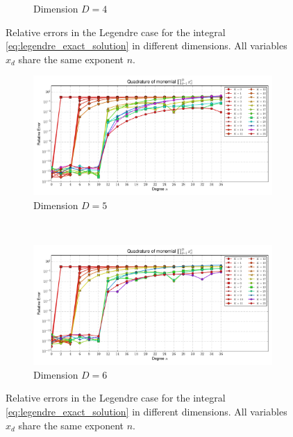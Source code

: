 \documentclass[a4paper,10pt]{article}
\begin{document}
\begin{figure}
\begin{subfigure}[b]{\linewidth}
    \caption{Dimension $D=4$}
    \label{fig:monomial_errors_legendre_multivariate_dimension_4}
  \end{subfigure}
  \caption{Relative errors in the Legendre case for the integral \eqref{eq:legendre_exact_solution}
    in different dimensions. All variables $x_d$ share the same exponent $n$.}
  \label{fig:monomial_errors_legendre_multivariate_a}
\end{figure}

\begin{figure}
  \begin{subfigure}[b]{\linewidth}
    \centering
    \includegraphics[width=\linewidth]{./img/monomial_errors_legendre_multivariate_dimension_5.pdf}
    \caption{Dimension $D=5$}
    \label{fig:monomial_errors_legendre_multivariate_dimension_5}
  \end{subfigure} \\
  \begin{subfigure}[b]{\linewidth}
    \centering
    \includegraphics[width=\linewidth]{./img/monomial_errors_legendre_multivariate_dimension_6.pdf}
    \caption{Dimension $D=6$}
    \label{fig:monomial_errors_legendre_multivariate_dimension_6}
  \end{subfigure}
  \caption{Relative errors in the Legendre case for the integral \eqref{eq:legendre_exact_solution}
    in different dimensions. All variables $x_d$ share the same exponent $n$.}
  \label{fig:monomial_errors_legendre_multivariate_b}
\end{figure}
\end{document}
